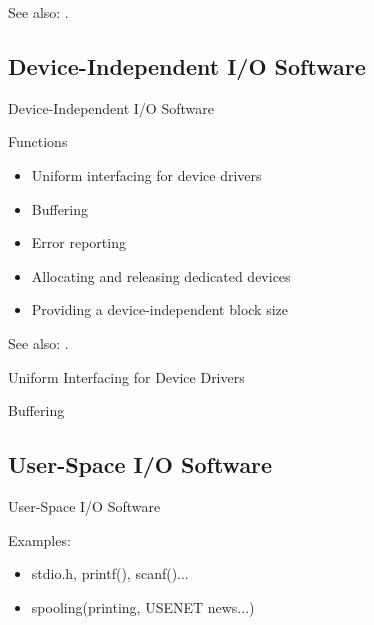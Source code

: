 See also: .

\subsection{Device-Independent I/O Software}

\begin{frame}{Device-Independent I/O Software}
  \begin{block}{Functions}
    \begin{itemize}
    \item Uniform interfacing for device drivers
    \item Buffering
    \item Error reporting
    \item Allocating and releasing dedicated devices
    \item Providing a device-independent block size
    \end{itemize}
  \end{block}
\end{frame}

See also: .

\begin{frame}{Uniform Interfacing for Device Drivers}
  \begin{center}
     
  \end{center}
\end{frame}

\begin{frame}{Buffering}
  \begin{center}
     
  \end{center}
\end{frame}

\subsection{User-Space I/O Software}

\begin{frame}{User-Space I/O Software}
  \begin{block}{Examples:}
    \begin{itemize}
    \item stdio.h, printf(), scanf()...
    \item spooling(printing, USENET news...)
    \end{itemize}
  \end{block}  
\end{frame}

